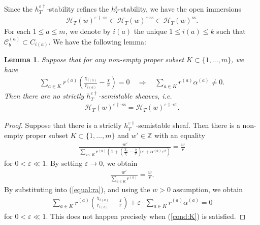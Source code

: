 \documentclass[11pt,oneside,a4paper,mathscr]{amsart}
\newtheorem{lemma}[thm]{Lemma}
\theoremstyle{definition}
\renewcommand{\leq}{\leqslant}
\newcommand{\cH}{\mathcal{H}}
\newcommand{\cC}{\mathcal{C}}
\begin{document}
Since the $h_T^{\varepsilon \dag}$-stability refines the $h_T^{\varepsilon}$-stability, 
we have the open immersions 
\begin{align*}
    \cH_T(w)^{\varepsilon \dag \text{-ss}} \subset \cH_T(w)^{\varepsilon \text{-ss}} \subset \cH_T(w)^{\mathrm{ss}}. 
\end{align*}
For each $1\leq a\leq m$, we denote by $i(a)$ the unique $1\leq i(a) \leq k$
such that $\cC_b^{(a)} \subset C_{i(a)}$. 
We have the following lemma: 
\begin{lemma}\label{lem:alphagen}
Suppose that for any non-empty proper subset $K\subset \{1, \ldots, m\}$, 
we have 
\begin{align}\label{cond:K}
    \sum_{a\in K}r^{(a)}\left( \frac{\chi_{i(a)}}{r_{i(a)}}-\frac{\chi}{r} \right)=0 \quad \Rightarrow \quad \sum_{a\in K} r^{(a)} \alpha^{(a)} \neq 0.
\end{align}
Then there are no strictly $h_T^{\varepsilon\dag}$-semistable sheaves, i.e.\ 
\begin{align}\label{ss=st}
    \cH_T(w)^{\varepsilon \dag \text{-ss}}=\cH_T(w)^{\varepsilon \dag \text{-st}}.
\end{align}
\end{lemma}
\begin{proof}
Suppose that there is a strictly $h_T^{\varepsilon\dag}$-semistable sheaf. 
Then there is a non-empty proper subset $K\subset \{1, \ldots, m\}$ and 
$w'\in \mathbb{Z}$ with an equality 
\begin{align}\label{equal:ra}
    \frac{w'}{\sum_{a\in K}r^{(a)}\left(1+\left(\frac{\chi_i}{r_i}-\frac{\chi}{r}  \right)\varepsilon +\alpha^{(a)}\varepsilon^2\right)}
    =\frac{w}{r}
\end{align}
for $0<\varepsilon \ll 1$. By setting $\varepsilon \to 0$, we obtain 
\begin{align*}
    \frac{w'}{\sum_{a\in K}r^{(a)}}
    =\frac{w}{r}.
\end{align*}
By substituting into (\ref{equal:ra}), and using the $w>0$ assumption, 
we obtain 
\begin{align*}
     \sum_{a\in K}r^{(a)}\left( \frac{\chi_{i(a)}}{r_{i(a)}}-\frac{\chi}{r} \right)+\varepsilon\cdot \sum_{a\in K} r^{(a)} \alpha^{(a)} =0
\end{align*}
for $0<\varepsilon \ll 1$. This does not happen precisely when (\ref{cond:K}) 
is satisfied. 
\end{proof}
\end{document}

